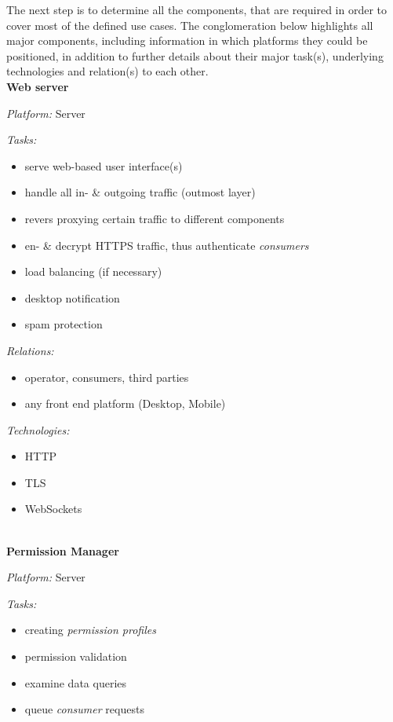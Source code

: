 \documentclass[12pt,english,a4paper,titlepage,cleardoublepage=empty,dottedtoc]{report}
\providecommand{\tightlist}{%
  \setlength{\itemsep}{0pt}\setlength{\parskip}{0pt}}
\begin{document}
The next step is to determine all the components, that are required in
order to cover most of the defined use cases. The conglomeration below
highlights all major components, including information in which
platforms they could be positioned, in addition to further details about
their major task(s), underlying technologies and relation(s) to each
other. ~\\
\textbf{Web server}

\emph{Platform:} Server

\emph{Tasks:}

\begin{itemize}
\tightlist
\item
  serve web-based user interface(s)
\item
  handle all in- \& outgoing traffic (outmost layer)
\item
  revers proxying certain traffic to different components
\item
  en- \& decrypt HTTPS traffic, thus authenticate \emph{consumers}
\item
  load balancing (if necessary)
\item
  desktop notification
\item
  spam protection
\end{itemize}

\emph{Relations:}

\begin{itemize}
\tightlist
\item
  operator, consumers, third parties
\item
  any front end platform (Desktop, Mobile)
\end{itemize}

\emph{Technologies:}

\begin{itemize}
\tightlist
\item
  HTTP
\item
  TLS
\item
  WebSockets
\end{itemize}

~\\
\textbf{Permission Manager}

\emph{Platform:} Server

\emph{Tasks:}

\begin{itemize}
\tightlist
\item
  creating \emph{permission profiles}
\item
  permission validation
\item
  examine data queries
\item
  queue \emph{consumer} requests
\end{itemize}
\end{document}
